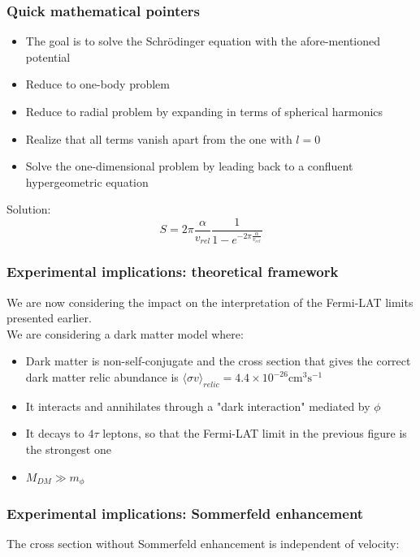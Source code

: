 \documentclass{beamer}
\begin{document}
\begin{frame}
\frametitle{Quick mathematical pointers}
\begin{itemize}
	\item The goal is to solve the Schrödinger equation with the afore-mentioned potential
	\item Reduce to one-body problem
	\item Reduce to radial problem by expanding in terms of spherical harmonics
	\item Realize that all terms vanish apart from the one with \(l=0\)
	\item Solve the one-dimensional problem by leading back to a confluent hypergeometric equation
\end{itemize}
\pause
Solution:
\[
	S = 2\pi \frac{\alpha }{v_{rel} } \frac{1}{1- e^{-2\pi \frac{\alpha }{v_{rel} }}}
\]
\end{frame}

\begin{frame}
\frametitle{Experimental implications: theoretical framework}
We are now considering the impact on the interpretation of the Fermi-LAT limits presented earlier.\\
We are considering a dark matter model where:
\begin{itemize}
	\item Dark matter is non-self-conjugate and the cross section that gives the correct dark matter relic abundance is \(\langle \sigma v \rangle_{relic} = 4.4 \times 10^{-26} \mathrm{cm ^3 s^{-1} }  \)
	\item It interacts and annihilates through a "dark interaction" mediated by \(\phi \)
	\item It decays to \(4\tau \) leptons, so that the Fermi-LAT limit in the previous figure is the strongest one
	\item \(M_{DM} \gg m_{\phi } \)
\end{itemize}
\end{frame}

\begin{frame}
\frametitle{Experimental implications: Sommerfeld enhancement}
The cross section without Sommerfeld enhancement is independent of velocity:
\end{frame}
\end{document}
